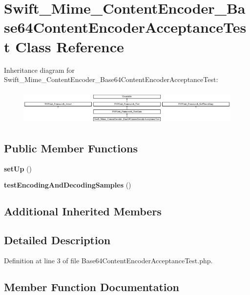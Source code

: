 \section{Swift\+\_\+\+Mime\+\_\+\+Content\+Encoder\+\_\+\+Base64\+Content\+Encoder\+Acceptance\+Test Class Reference}
\label{class_swift___mime___content_encoder___base64_content_encoder_acceptance_test}
Inheritance diagram for Swift\+\_\+\+Mime\+\_\+\+Content\+Encoder\+\_\+\+Base64\+Content\+Encoder\+Acceptance\+Test\+:\begin{figure}[H]
\begin{center}
\leavevmode
\includegraphics[height=1.807910cm]{class_swift___mime___content_encoder___base64_content_encoder_acceptance_test}
\end{center}
\end{figure}
\subsection*{Public Member Functions}
\begin{DoxyCompactItemize}
\item 
{\bf set\+Up} ()
\item 
{\bf test\+Encoding\+And\+Decoding\+Samples} ()
\end{DoxyCompactItemize}
\subsection*{Additional Inherited Members}


\subsection{Detailed Description}


Definition at line 3 of file Base64\+Content\+Encoder\+Acceptance\+Test.\+php.



\subsection{Member Function Documentation}
